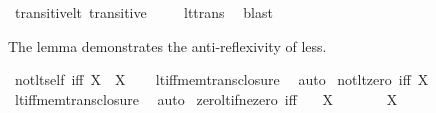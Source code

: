 \begin{isabellebody}
\isamarkupfalse%
\ transitive{\isacharunderscore}{\kern0pt}lt{\isacharcolon}{\kern0pt}\ {\isachardoublequoteopen}transitive\ {\isacharparenleft}{\kern0pt}{\isacharless}{\kern0pt}{\isacharparenright}{\kern0pt}{\isachardoublequoteclose}\isanewline
%
\isadelimproof
\ \ %
\endisadelimproof
%
\isatagproof
{}\isamarkupfalse%
\ lt{\isacharunderscore}{\kern0pt}trans\ \isamarkupfalse%
\ blast%
\endisatagproof
{\isafoldproof}%
%
\isadelimproof
%
\endisadelimproof
%
\begin{isamarkuptext}%
The lemma demonstrates the anti-reflexivity of less.%
\end{isamarkuptext}\isamarkuptrue%
\isamarkupfalse%
\ not{\isacharunderscore}{\kern0pt}lt{\isacharunderscore}{\kern0pt}self\ {\isacharbrackleft}{\kern0pt}iff{\isacharbrackright}{\kern0pt}{\isacharcolon}{\kern0pt}\ {\isachardoublequoteopen}{\isasymnot}{\isacharparenleft}{\kern0pt}X\ {\isacharless}{\kern0pt}\ X{\isacharparenright}{\kern0pt}{\isachardoublequoteclose}\isanewline
%
\isadelimproof
\ \ %
\endisadelimproof
%
\isatagproof
{}\isamarkupfalse%
\ lt{\isacharunderscore}{\kern0pt}iff{\isacharunderscore}{\kern0pt}mem{\isacharunderscore}{\kern0pt}trans{\isacharunderscore}{\kern0pt}closure\ \isamarkupfalse%
\ auto%
\endisatagproof
{\isafoldproof}%
%
\isadelimproof
\isanewline
%
\endisadelimproof
\isanewline
{}\isamarkupfalse%
\ not{\isacharunderscore}{\kern0pt}lt{\isacharunderscore}{\kern0pt}zero\ {\isacharbrackleft}{\kern0pt}iff{\isacharbrackright}{\kern0pt}{\isacharcolon}{\kern0pt}\ {\isachardoublequoteopen}{\isasymnot}{\isacharparenleft}{\kern0pt}X\ {\isacharless}{\kern0pt}\ {}{\isacharparenright}{\kern0pt}{\isachardoublequoteclose}\isanewline
%
\isadelimproof
\ \ %
\endisadelimproof
%
\isatagproof
{}\isamarkupfalse%
\ lt{\isacharunderscore}{\kern0pt}iff{\isacharunderscore}{\kern0pt}mem{\isacharunderscore}{\kern0pt}trans{\isacharunderscore}{\kern0pt}closure\ \isamarkupfalse%
\ auto%
\endisatagproof
{\isafoldproof}%
%
\isadelimproof
\isanewline
%
\endisadelimproof
\isanewline
{}\isamarkupfalse%
\ zero{\isacharunderscore}{\kern0pt}lt{\isacharunderscore}{\kern0pt}if{\isacharunderscore}{\kern0pt}ne{\isacharunderscore}{\kern0pt}zero\ {\isacharbrackleft}{\kern0pt}iff{\isacharbrackright}{\kern0pt}{\isacharcolon}{\kern0pt}\isanewline
\ \ \ {\isachardoublequoteopen}X\ {\isasymnoteq}\ {}{\isachardoublequoteclose}\isanewline
\ \ \ {\isachardoublequoteopen}{}\ {\isacharless}{\kern0pt}\ X{\isachardoublequoteclose}\isanewline

\end{isabellebody}
